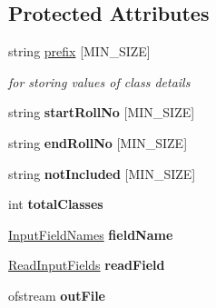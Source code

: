 \subsection*{Protected Attributes}
\begin{DoxyCompactItemize}
\item 
string \hyperlink{classRollNoDetails_a2126e353865b8e215513fe17785ef230}{prefix} \mbox{[}M\-I\-N\-\_\-\-S\-I\-Z\-E\mbox{]}
\begin{DoxyCompactList}\small\item\em for storing values of class details \end{DoxyCompactList}\item 
\hypertarget{classRollNoDetails_a441e0e8f352b04e2eb104d8a69d939c2}{string {\bfseries start\-Roll\-No} \mbox{[}M\-I\-N\-\_\-\-S\-I\-Z\-E\mbox{]}}\label{classRollNoDetails_a441e0e8f352b04e2eb104d8a69d939c2}

\item 
\hypertarget{classRollNoDetails_a8231b6d71b73f825f29a84e290d6736b}{string {\bfseries end\-Roll\-No} \mbox{[}M\-I\-N\-\_\-\-S\-I\-Z\-E\mbox{]}}\label{classRollNoDetails_a8231b6d71b73f825f29a84e290d6736b}

\item 
\hypertarget{classRollNoDetails_a1280f14b2160fb396a675bc4ba5fb85d}{string {\bfseries not\-Included} \mbox{[}M\-I\-N\-\_\-\-S\-I\-Z\-E\mbox{]}}\label{classRollNoDetails_a1280f14b2160fb396a675bc4ba5fb85d}

\item 
\hypertarget{classRollNoDetails_aa2d166949084d8f3ba6d8ab70f49282a}{int {\bfseries total\-Classes}}\label{classRollNoDetails_aa2d166949084d8f3ba6d8ab70f49282a}

\item 
\hypertarget{classRollNoDetails_a269aeef5b1c437d9f6013d5a76c26186}{\hyperlink{classInputFieldNames}{Input\-Field\-Names} {\bfseries field\-Name}}\label{classRollNoDetails_a269aeef5b1c437d9f6013d5a76c26186}

\item 
\hypertarget{classRollNoDetails_aa91e1fe3aea1075074eced641c761615}{\hyperlink{classReadInputFields}{Read\-Input\-Fields} {\bfseries read\-Field}}\label{classRollNoDetails_aa91e1fe3aea1075074eced641c761615}

\item 
\hypertarget{classRollNoDetails_a0c858cf00fffdea8380f1a69d95d325f}{ofstream {\bfseries out\-File}}\label{classRollNoDetails_a0c858cf00fffdea8380f1a69d95d325f}


\end{DoxyCompactItemize}
